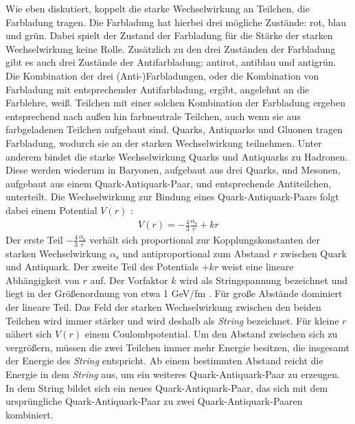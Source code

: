 Wie eben diskutiert, koppelt die starke Wechselwirkung an Teilchen, die Farbladung tragen.
Die Farbladung hat hierbei drei mögliche Zustände: rot, blau und grün.
Dabei spielt der Zustand der Farbladung für die Stärke der starken Wechselwirkung keine Rolle.
Zusätzlich zu den drei Zuständen der Farbladung gibt es auch drei Zustände der Antifarbladung: antirot, antiblau und antigrün.
\newline
Die Kombination der drei (Anti-)Farbladungen, oder die Kombination von Farbladung mit ent\-spre\-chender Antifarbladung, ergibt, angelehnt an die Farblehre, weiß.
Teilchen mit einer solchen Kombination der Farbladung ergeben entsprechend nach außen hin farbneutrale Teilchen, auch wenn sie aus farbgeladenen Teilchen aufgebaut sind.
\newline
Quarks, Antiquarks und Gluonen tragen Farbladung, wodurch sie an der starken Wechselwirkung teilnehmen.
Unter anderem bindet die starke Wechselwirkung Quarks und Antiquarks zu  Hadronen.
Diese werden wiederum in  Baryonen, aufgebaut aus drei Quarks, und  Mesonen, aufgebaut aus einem Quark-Antiquark-Paar, und entsprechende Antiteilchen, unterteilt.
\newline
Die Wechselwirkung zur Bindung eines Quark-Antiquark-Paars folgt dabei einem Potential $V(r)$ \cite{script:kt1}:
\begin{align} \label{eq:Potential}
V(r) = -\frac{4}{3}\frac{\alpha_\text{s}}{r} + kr 
\end{align}
Der erste Teil $-\frac{4}{3}\frac{\alpha_\text{s}}{r}$ verhält sich proportional zur  Kopplungskonstanten der starken Wechselwirkung $\alpha_{\text{s}}$ und antiproportional zum Abstand $r$ zwischen Quark und Antiquark.
\newline
Der zweite Teil des Potentials $+kr$ weist eine lineare Abhängigkeit von $r$ auf.
Der Vorfaktor $k$ wird als Stringspannung bezeichnet und liegt in der Größenordnung von etwa 1 GeV/fm \cite{Zheng:2018yxq}.
Für große Abstände dominiert der lineare Teil.
Das Feld der starken Wechselwirkung zwischen den beiden Teilchen wird immer stärker und wird deshalb als \textit{String} bezeichnet.
Für kleine $r$ nähert sich $V(r)$ einem Coulombpotential.
\newline
Um den Abstand zwischen sich zu vergrößern, müssen die zwei Teilchen immer mehr Energie besitzen, die insgesamt der Energie des \textit{String} entspricht.
Ab einem bestimmten Abstand reicht die Energie in dem \textit{String} aus, um ein weiteres Quark-Antiquark-Paar zu erzeugen.
In dem String bildet sich ein neues Quark-Antiquark-Paar, das sich mit dem ursprüngliche Quark-Antiquark-Paar zu zwei Quark-Antiquark-Paaren kombiniert.
